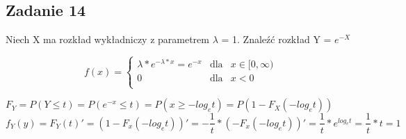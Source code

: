 \subsection{Zadanie 14}


Niech X ma rozkład wykładniczy z parametrem $\lambda$ = 1. Znaleźć rozkład Y = $e^{-X}$


$$
f(x) = \left\{
\begin{array}{rcl}
 \lambda*e^{ -\lambda*x } = e^{-x} & \text{dla} & x \in [0,\infty)\\
 0 & \text{dla} & x < 0\\
\end{array}
\right.
$$



\noindent
\newline
\newline
$
F_{Y} = P(Y \leq t) = P(e^{-x} \leq t) = P(x \geq -log_{e}t) = P(1 - F_{X}(-log_{e}t))
$
\newline
\newline
$
f_{Y}(y) = F_{Y}(t)' = (1 - F_{x}(-log_{e}t))' = -\dfrac{1}{t} * (-F_{x}(-log_{e}t))' = \dfrac{1}{t} * e^{log_{e}t} = \dfrac{1}{t} * t = 1
$
